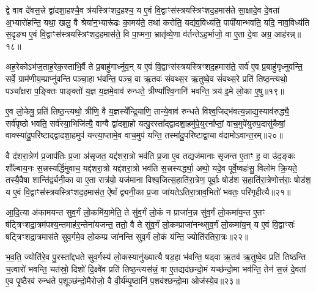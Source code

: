 द्वे वाव दे॑वस॒त्त्रे द्वा॑दशा॒हश्चै॒व त्र॑यस्त्रिꣳशद॒हश्च॒ य ए॒वं वि॒द्वाꣳस॑स्त्रयस्त्रिꣳशद॒हमास॑ते सा॒क्षादे॒व दे॒वता॑ अ॒भ्यारो॑हन्ति॒ यथा॒ खलु॒ वै श्रेया॑न॒भ्यारू॑ढः का॒मय॑ते॒ तथा॑ करोति॒ यद्य॑व॒विध्य॑ति॒ पापी॑यान्भवति॒ यदि॒ नाव॒विध्य॑ति स॒दृङ्य ए॒वं वि॒द्वाꣳस॑स्त्रयस्त्रिꣳशद॒हमास॑ते॒ वि पा॒प्मना॒ भ्रातृ॑व्ये॒णा व॑र्तन्ते\-ऽह॒र्भाजो॒ वा ए॒ता दे॒वा अग्र॒ आह॑रन्न्॥१८॥

अह॒रेको\-ऽभ॑ज॒ताह॒रेक॒स्ताभि॒र्वै ते प्र॒बाहु॑गार्ध्नुव॒न् य ए॒वं वि॒द्वाꣳस॑स्त्रयस्त्रिꣳशद॒हमास॑ते॒ सर्व॑ ए॒व प्र॒बाहु॑गृध्नुवन्ति॒ सर्वे॒ ग्राम॑णीय॒म्प्राप्नु॑वन्ति पञ्चा॒हा भ॑वन्ति॒ पञ्च॒ वा ऋ॒तवः॑ संवथ्स॒र ऋ॒तुष्वे॒व सं॑वथ्स॒रे प्रति॑ तिष्ठ॒न्त्यथो॒ पञ्चा᳚क्षरा प॒ङ्क्तिः पाङ्क्तो॑ य॒ज्ञ य॒ज्ञमे॒वाव॑ रुन्धते॒ त्रीण्या᳚श्वि॒नानि॑ भवन्ति॒ त्रय॑ इ॒मे लो॒का ए॒षु॥१९॥

ए॒व लो॒केषु॒ प्रति॑ तिष्ठ॒न्त्यथो॒ त्रीणि॒ वै य॒ज्ञस्ये᳚न्द्रि॒याणि॒ तान्ये॒वाव॑ रुन्धते विश्व॒जिद्भ॑वत्य॒न्नाद्य॒स्याव॑रुद्ध्यै॒ सर्व॑पृष्ठो भवति॒ सर्व॑स्या॒भिजि॑त्यै॒ वाग्वै द्वा॑दशा॒हो यत्पु॒रस्ता᳚द्द्वादशा॒हमु॑पे॒युरना᳚प्तां॒ वाच॒मुपे॑युरुप॒दासु॑कैषां॒ वाक्स्या॑दु॒परि॑ष्टाद्द्वादशा॒हमुप॑ यन्त्या॒प्तामे॒व वाच॒मुप॑ यन्ति॒ तस्मा॑दु॒परि॑ष्टाद्वा॒चा व॑दामो\-ऽवान्त॒रम्॥२०॥

वै द॑शरा॒त्रेण॑ प्र॒जाप॑तिः प्र॒जा अ॑सृजत॒ यद्द॑शरा॒त्रो भव॑ति प्र॒जा ए॒व तद्यज॑मानाः सृजन्त ए॒ताꣳ ह॒ वा उ॑द॒ङ्कः शौ᳚ल्बाय॒नः स॒त्त्रस्यर्द्धि॑मुवाच॒ यद्द॑शरा॒त्रो यद्द॑शरा॒त्रो भव॑ति स॒त्त्रस्यर्द्ध्या॒ अथो॒ यदे॒व पूर्वे॒ष्वहः॑सु॒ विलो॑म क्रि॒यते॒ तस्यै॒वैषा शान्ति॑र्द्व्यनी॒का वा ए॒ता रात्र॑यो॒ यज॑माना विश्व॒जित्स॒हाति॑रा॒त्रेण॒ पूर्वाः॒ षोड॑श स॒हाति॑रा॒त्रेणोत्त॑राः॒ षोड॑श॒ य ए॒वं वि॒द्वाꣳस॑स्त्रयस्त्रिꣳशद॒हमास॑त॒ ऐ॑षां᳚ द्व्यनी॒का प्र॒जा जा॑यते\-ऽतिरा॒त्राव॒भितो॑ भवतः॒ परि॑गृहीत्यै॥२१॥

{\anuvakamend[{अ॒ह॒र॒न्ने॒ष्व॑वान्त॒रꣳ षोड॑श स॒ह स॒प्तद॑श च॥५॥}]}

आ॒दि॒त्या अ॑कामयन्त सुव॒र्गं लो॒कमि॑या॒मेति॒ ते सु॑व॒र्गं लो॒कं न प्राजा॑न॒न्न सु॑व॒र्गं लो॒कमा॑य॒न्त ए॒तꣳ ष॑ट्त्रिꣳशद्रा॒त्रम॑पश्य॒न्तमाह॑र॒न्तेना॑यजन्त॒ ततो॒ वै ते सु॑व॒र्गं लो॒कम्प्राजा॑नन्थ्सुव॒र्गं लो॒कमा॑य॒न् य ए॒वं वि॒द्वाꣳसः॑ षट्त्रिꣳशद्रा॒त्रमास॑ते सुव॒र्गमे॒व लो॒कम्प्र जा॑नन्ति सुव॒र्गं लो॒कं य॑न्ति॒ ज्योति॑रतिरा॒त्रः॥२२॥

भ॒व॒ति॒ ज्योति॑रे॒व पु॒रस्ता᳚द्दधते सुव॒र्गस्य॑ लो॒कस्यानु॑ख्यात्यै षड॒हा भ॑वन्ति॒ षड्वा ऋ॒तव॑ ऋ॒तुष्वे॒व प्रति॑ तिष्ठन्ति च॒त्वारो॑ भवन्ति॒ चत॑स्रो॒ दिशो॑ दि॒क्ष्वे॑व प्रति॑ तिष्ठ॒न्त्यस॑त्त्रं॒ वा ए॒तद्यद॑छन्दो॒मं यच्छ॑न्दो॒मा भव॑न्ति॒ तेन॑ स॒त्त्रं दे॒वता॑ ए॒व पृ॒ष्ठैरव॑ रुन्धते प॒शूञ्छ॑न्दो॒मैरोजो॒ वै वी॒र्य॑म्पृ॒ष्ठानि॑ प॒शव॑श्छन्दो॒मा ओज॑स्ये॒व॥२३॥

